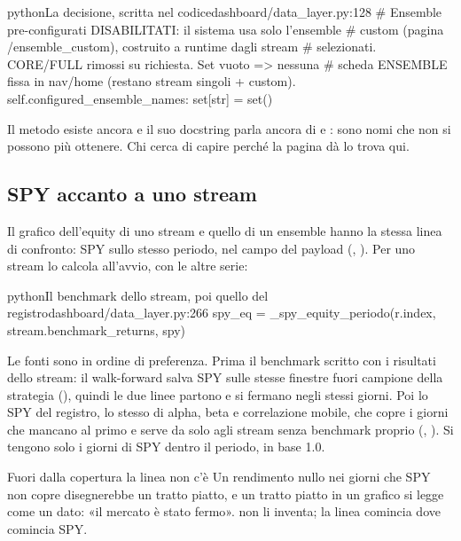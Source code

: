 \begin{codiceInterno}{python}{La decisione, scritta nel codice}{dashboard/data\_layer.py:128}
        # Ensemble pre-configurati DISABILITATI: il sistema usa solo l'ensemble
        # custom (pagina /ensemble_custom), costruito a runtime dagli stream
        # selezionati. CORE/FULL rimossi su richiesta. Set vuoto => nessuna
        # scheda ENSEMBLE fissa in nav/home (restano stream singoli + custom).
        self.configured_ensemble_names: set[str] = set()
\end{codiceInterno}

\noindent
Il metodo  esiste ancora e il suo docstring parla
ancora di  e : sono nomi che non si possono più
ottenere. Chi cerca di capire perché la pagina  dà
 lo trova qui.

\subsection{SPY accanto a uno stream}\label{sez:spy-stream}

Il grafico dell'equity di uno stream e quello di un ensemble hanno la stessa
linea di confronto: SPY sullo stesso periodo, nel campo 
del payload (, ).
Per uno stream lo calcola  all'avvio, con
le altre serie:

\begin{codiceInterno}{python}{Il benchmark dello stream, poi quello del registro}{dashboard/data\_layer.py:266}
            spy_eq = _spy_equity_periodo(r.index, stream.benchmark_returns, spy)
\end{codiceInterno}

\noindent
Le fonti sono in ordine di preferenza. Prima il benchmark scritto con i
risultati dello stream: il walk-forward salva SPY sulle stesse finestre fuori
campione della strategia (), quindi le due linee
partono e si fermano negli stessi giorni. Poi lo SPY del registro, lo stesso
di alpha, beta e correlazione mobile, che copre i giorni che mancano al primo
e serve da solo agli stream senza benchmark proprio (,
). Si tengono solo i giorni di SPY dentro il periodo, in
base 1.0.

\begin{attenzione}{Fuori dalla copertura la linea non c'è}
Un rendimento nullo nei giorni che SPY non copre disegnerebbe un tratto
piatto, e un tratto piatto in un grafico si legge come un dato: «il mercato è
stato fermo».  non li inventa; la linea
comincia dove comincia SPY.
\end{attenzione}

